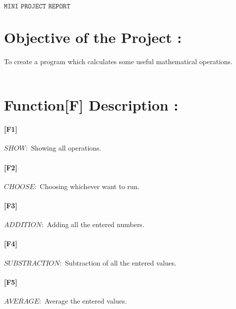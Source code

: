 \documentclass[12pt,a4paper]{article}
\begin{document}
\vspace{3cm}
\begin{Large}
\begin{center}
$\texttt{MINI PROJECT REPORT}$
\end{center}
\end{Large}

\hline
\hline
\vspace{4cm}
\section{Objective of the Project :}
\paragraph{}To create a program which calculates some useful mathematical operations. \\\\

\pagebreak

\section{Function[F] Description :}
\vspace{1cm}
\paragraph{[F1]}$SHOW:$ Showing all operations.			
\\														
\paragraph{[F2]}$CHOOSE:$ Choosing whichever want to run.
\\												
\paragraph{[F3]}$ADDITION:$ Adding all the entered numbers.					
\\				
\paragraph{[F4]}$SUBSTRACTION:$ Subtraction of all the entered values.
\\
\paragraph{[F5]}$AVERAGE:$ Average the entered values.
\\
\end{document}
